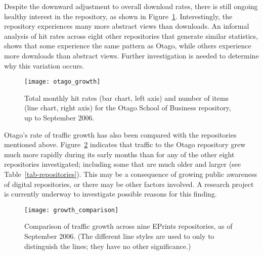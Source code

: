 \documentclass[12pt,pdftex,a4paper,titlepage]{article}
\begin{document}
Despite the downward adjustment to overall download rates, there is still ongoing healthy interest in the repository, as shown in Figure~\ref{fig-otago-growth}. Interestingly, the repository experiences many more abstract views than downloads. An informal analysis of hit rates across eight other repositories that generate similar statistics, shows that some experience the same pattern as Otago, while others experience more downloads than abstract views. Further investigation is needed to determine why this variation occurs.


\begin{figure}
	\centering
	\texttt{[image: otago\_growth]}
	\caption{Total monthly hit rates (bar chart, left axis) and number of items (line chart, right axis) for the Otago School of Business repository, up to September 2006.}
	\label{fig-otago-growth}
\end{figure}


Otago's rate of traffic growth has also been compared with the repositories mentioned above. Figure~\ref{fig-growth-comparison} indicates that traffic to the Otago repository grew much more rapidly during its early months than for any of the other eight repositories investigated; including some that are much older and larger (see Table~\ref{tab-repositories}). This may be a consequence of growing public awareness of digital repositories, or there may be other factors involved. A research project is currently underway to investigate possible reasons for this finding.


\begin{figure}
	\centering
	\texttt{[image: growth\_comparison]}
	\caption{Comparison of traffic growth across nine EPrints repositories, as of September 2006. (The different line styles are used to only to distinguish the lines; they have no other significance.)}
	\label{fig-growth-comparison}
\end{figure}
\end{document}
